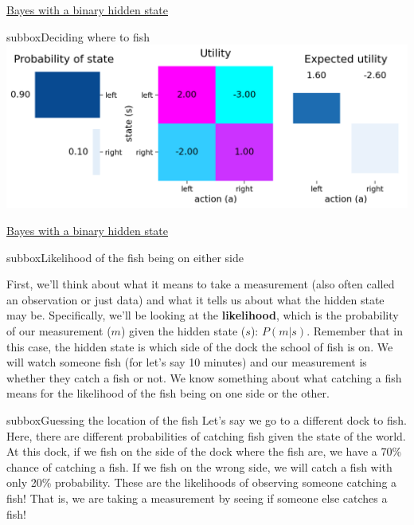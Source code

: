 \begin{textbox}{\href{https://compneuro.neuromatch.io/tutorials/W3D1_BayesianDecisions/student/W3D1_Tutorial1.html}{Bayes with a binary hidden state } }
\begin{subbox}{subbox}{Deciding where to fish}
\centering
\includegraphics[scale=0.23]{Figures/BD/BD_Figure1.png}

\end{subbox}
\end{textbox}
\begin{textbox}{\href{https://compneuro.neuromatch.io/tutorials/W3D1_BayesianDecisions/student/W3D1_Tutorial1.html}{Bayes with a binary hidden state } }
\begin{subbox}{subbox}{Likelihood of the fish being on either side}
\scriptsize

First, we'll think about what it means to take a measurement (also often called an observation or just data) and what it tells us about what the hidden state may be. Specifically, we'll be looking at the \textbf{likelihood}, which is the probability of our measurement ($m$) given the hidden state ($s$): $P(m | s)$. Remember that in this case, the hidden state is which side of the dock the school of fish is on.
We will watch someone fish (for let's say 10 minutes) and our measurement is whether they catch a fish or not. We know something about what catching a fish means for the likelihood of the fish being on one side or the other.

\end{subbox}

\begin{subbox}{subbox}{Guessing the location of the fish}
\scriptsize
Let's say we go to a different dock to fish. Here, there are different probabilities of catching fish given the state of the world. At this dock, if we fish on the side of the dock where the fish are, we have a 70\% chance of catching a fish. If we fish on the wrong side, we will catch a fish with only 20\% probability. These are the likelihoods of observing someone catching a fish! That is, we are taking a measurement by seeing if someone else catches a fish!


\end{subbox}
\end{textbox}
